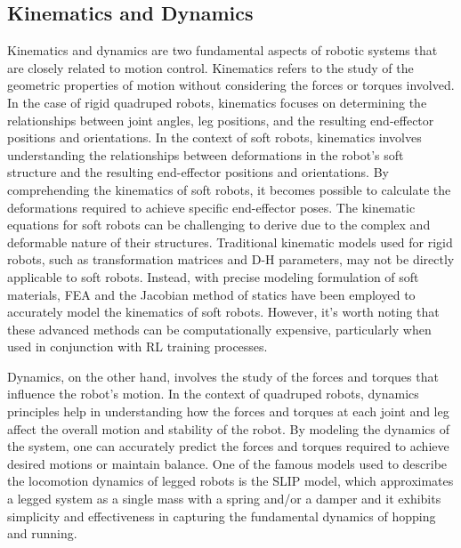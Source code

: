 \subsection{Kinematics and Dynamics}
Kinematics and dynamics are two fundamental aspects of robotic systems that are closely related to motion control. Kinematics refers to the study of the geometric properties of motion without considering the forces or torques involved. In the case of rigid quadruped robots, kinematics focuses on determining the relationships between joint angles, leg positions, and the resulting end-effector positions and orientations.  In the context of soft robots, kinematics involves understanding the relationships between deformations in the robot's soft structure and the resulting end-effector positions and orientations. By comprehending the kinematics of soft robots, it becomes possible to calculate the deformations required to achieve specific end-effector poses. The kinematic equations for soft robots can be challenging to derive due to the complex and deformable nature of their structures. Traditional kinematic models used for rigid robots, such as transformation matrices and \ac{D-H} parameters, may not be directly applicable to soft robots\cite{fangKinematicsSoftRobots2020}. Instead, with precise modeling formulation of soft materials, \ac{FEA}\cite{leeFEMbasedSoftRobotic2017} and the Jacobian method of statics\cite{giorelliNeuralNetworkJacobian2015} have been employed to accurately model the kinematics of soft robots. However, it's worth noting that these advanced methods can be computationally expensive, particularly when used in conjunction with \ac{RL} training processes. 

Dynamics, on the other hand, involves the study of the forces and torques that influence the robot's motion. In the context of quadruped robots, dynamics principles help in understanding how the forces and torques at each joint and leg affect the overall motion and stability of the robot. By modeling the dynamics of the system, one can accurately predict the forces and torques required to achieve desired motions or maintain balance. One of the famous models used to describe the locomotion dynamics of legged robots is the \ac{SLIP} model\cite{poulakakisSpringLoadedInverted2009}, which approximates a legged system as a single mass with a spring and/or a damper and it exhibits simplicity and effectiveness in capturing the fundamental dynamics of hopping and running.

